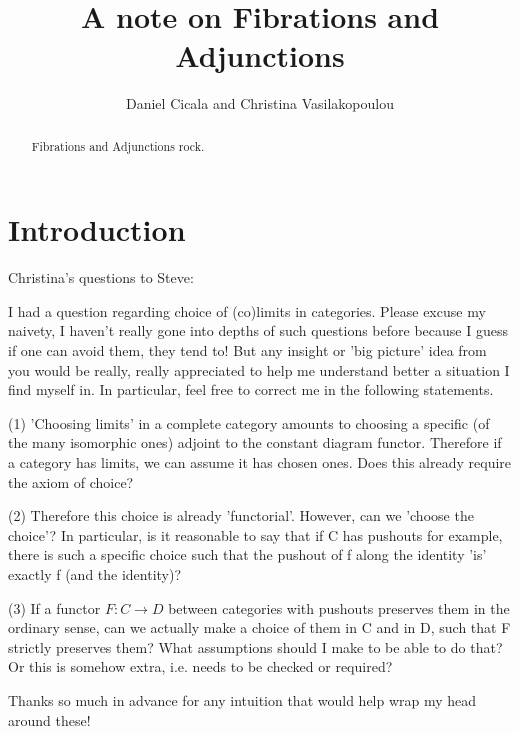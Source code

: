 \documentclass{amsart}
\begin{document}
\title{A note on Fibrations and Adjunctions}

\author{Daniel Cicala and Christina Vasilakopoulou} 
\address{Departement of Mathematics, University of California, Riverside, 900 University Avenue, 92521, USA}

\begin{abstract}
Fibrations and Adjunctions rock.
\end{abstract}

\maketitle

\tableofcontents

\section{Introduction}
{\chris Christina's questions to Steve:}

I had a question regarding choice of (co)limits in categories. Please excuse my naivety, I haven't really gone into depths of such
questions before because I guess if one can avoid them, they tend to! But any insight or 'big picture' idea from you would be really,
really appreciated to help me understand better a situation I find myself in. In particular, feel free to correct me in the following
statements.

(1) 'Choosing limits' in a complete category amounts to choosing a specific (of the many isomorphic ones) adjoint to the
constant diagram functor. Therefore if a category has limits, we can assume it has chosen ones. Does this already require the axiom of
choice?

(2) Therefore this choice is already 'functorial'. However, can we 'choose the choice'? In particular, is it reasonable
to say that if C has pushouts for example, there is such a specific choice such that the pushout of f along the identity 'is'
exactly f (and the identity)?

(3) If a functor $F:C\to D$ between categories with pushouts preserves them in the ordinary sense, can we actually make a
choice of them in C and in D, such that F strictly preserves them? What assumptions should I make to be able to do that?
Or this is somehow extra, i.e. needs to be checked or required?

Thanks so much in advance for any intuition that would help wrap my head around these!
\end{document}
